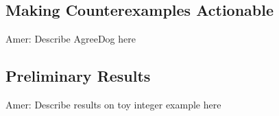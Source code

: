 \subsection{Making Counterexamples Actionable}

Amer: Describe AgreeDog here

\subsection{Preliminary Results}

Amer: Describe results on toy integer example here